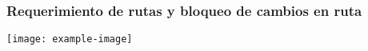 \subsubsection{Requerimiento de rutas y bloqueo de cambios en ruta}

\lipsum[1]
\texttt{[image: example-image]}
\lipsum[1]